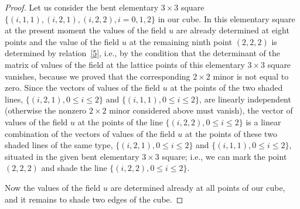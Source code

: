 \documentclass[pdftex]{sigma}
\begin{document}
\begin{proof}
Let us consider the bent elementary $3 \times 3$ square $\{(i, 1,
1), (i, 2, 1), (i, 2, 2), i = 0, 1, 2\}$ in our cube. In this
elementary square at the present moment the values of the f\/ield $u$
are already determined at eight points and the value of the f\/ield
$u$ at the remaining ninth point $(2, 2, 2)$ is determined by
relation~\eqref{5}, i.e., by the condition that the
determinant of the matrix of values of the f\/ield at the lattice
points of this elementary $3 \times 3$ square vanishes, because we
proved that the corresponding $2 \times 2$ minor is not equal to
zero. Since the vectors of values of the f\/ield $u$ at the points of
the two shaded lines, $\{(i, 2, 1), 0 \leq i \leq 2\}$ and $\{(i, 1,
1), 0 \leq i \leq 2\}$, are linearly independent (otherwise the
nonzero $2 \times 2$ minor considered above must vanish), the vector
of values of the f\/ield $u$ at the points of the line $\{(i, 2, 2), 0
\leq i \leq 2\}$ is a linear combination of the vectors of values of
the f\/ield $u$ at the points of these two shaded lines of the same
type, $\{(i, 2, 1), 0 \leq i \leq 2\}$ and $\{(i, 1, 1), 0 \leq i
\leq 2\}$, situated in the given bent elementary $3 \times 3$
square; i.e., we can mark the point $(2, 2, 2)$ and shade the line
$\{(i, 2, 2), 0 \leq i \leq 2\}$.


Now the values of the f\/ield $u$ are determined already at all points
of our cube, and it remains to shade two edges of the cube.



\end{proof}
\end{document}

